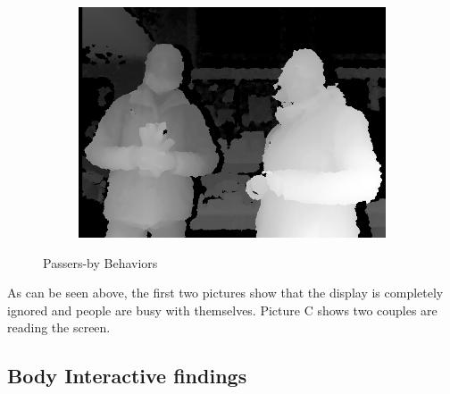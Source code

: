 \begin{figure}[H]
\begin{subfigure}[H]{0.32\textwidth}
        \centering
        \includegraphics[width=\textwidth]{Figures/8/non_inter_findings/effects/reading}
        \caption{}
        \label{fig:non-reading}
    \end{subfigure}
    \caption{Passers-by Behaviors}
    \label{fig:three-non-behavior}
\end{figure}

As can be seen above, the first two pictures show that the display is completely ignored and people are busy with themselves. Picture C shows two couples are reading the screen.

\subsection{Body Interactive findings}

